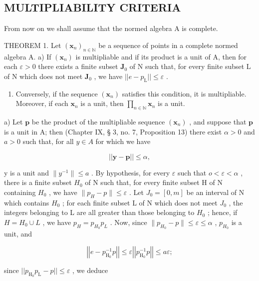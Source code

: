 \subsection{MULTIPLIABILITY CRITERIA}

From now on we shall assume that the normed algebra A is complete.

THEOREM 1. Let \((\pmb{x}_n)_{n\in \mathbb{N}}\) be a sequence of points in a complete normed algebra A. a) If \((\pmb{x}_n)\) is multipliable and if its product is a unit of A, then for each \(\varepsilon >0\) there exists a finite subset \(\mathbf{J}_0\) of N such that, for every finite subset L of N which does not meet \(\mathbf{J}_0\) , we have \(||e - p_{\mathrm{L}}||\leqslant \varepsilon\) .

\begin{enumerate}
\def\labelenumi{\alph{enumi})}
\setcounter{enumi}{1}
\item
  Conversely, if the sequence \((\pmb{x}_n)\) satisfies this condition, it is multipliable. Moreover, if each \(\pmb{x}_n\) is a unit, then \(\prod_{n\in \mathbb{N}}\pmb{x}_n\) is a unit.
\end{enumerate}

a) Let \(\pmb{p}\) be the product of the multipliable sequence \((\pmb{x}_n)\) , and suppose that \(\pmb{p}\) is a unit in A; then (Chapter IX, § 3, no. 7, Proposition 13) there exist \(\alpha > 0\) and \(a > 0\) such that, for all \(y \in A\) for which we have

\[
\left| \left| \boldsymbol {y} - \boldsymbol {p} \right| \right| \leqslant \alpha ,
\]

y is a unit and \(\|y^{-1}\|\leqslant a\) . By hypothesis, for every \(\varepsilon\) such that \(o<\varepsilon<\alpha\) , there is a finite subset \(H_{0}\) of N such that, for every finite subset H of N containing \(H_{0}\) , we have \(\|p_{H}-p\|\leqslant\varepsilon\) . Let \(J_{0}=[0,m]\) be an interval of N which contains \(H_{0}\) ; for each finite subset L of N which does not meet \(J_{0}\) , the integers belonging to L are all greater than those belonging to \(H_{0}\) ; hence, if \(H=H_{0}\cup L\) , we have \(p_{H}=p_{H_{0}}p_{L}\) . Now, since \(\|p_{H_{0}}-p\|\leqslant\varepsilon\leqslant\alpha\) , \(p_{H_{0}}\) is a unit, and

\[
\left| \left| e - p _ {\mathrm{H} _ {0}} ^ {- 1} p \right| \right| \leqslant \varepsilon \left| \left| p _ {\mathrm{H} _ {0}} ^ {- 1} p \right| \right| \leqslant a \varepsilon ;
\]

since \(||p_{\mathrm{H_0}}p_{\mathrm{L}} - p|| \leqslant \varepsilon\) , we deduce

